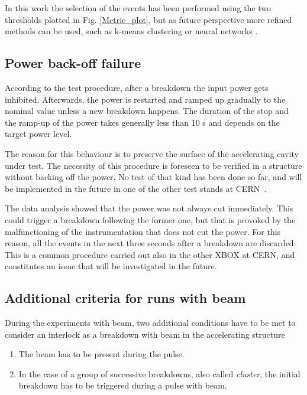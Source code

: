 In this work the selection of the events has been performed using the two thresholds plotted in Fig. \ref{Metric_plot}, but as future perspective more refined methods can be used, such as k-means clustering or neural networks \cite{ML:book}.



\subsection{Power back-off failure}
\label{sec:pbof}

According to the test procedure, after a breakdown the input power gets inhibited. Afterwards, the power is restarted and ramped up gradually to the nominal value unless a new breakdown happens. The duration of the stop and the ramp-up of the power takes generally less than 10 s and depends on the target power level.

The reason for this behaviour is to preserve the surface of the accelerating cavity under test. The necessity of this procedure is foreseen to be verified in a structure without backing off the power. No test of that kind has been done so far, and will be implemented in the future in one of the other test stands at CERN~\cite{Walter:PC}.

The data analysis showed that the power was not always cut immediately. This could trigger a breakdown  following the former one, but that is provoked by the malfunctioning of the instrumentation that does not cut the power. For this reason, all the events in the next three seconds after a breakdown are discarded. This is a common procedure carried out also in the other XBOX at CERN, and constitutes an issue that will be investigated in the future. 


\subsection[Additional criteria for runs with beam]{Additional criteria for runs with beam}

During the experiments with beam, two additional conditions have to be met to consider an interlock as a breakdown with beam in the accelerating structure
\begin{enumerate}
\item The beam has to be present during the pulse.
\item In the case of a group of successive breakdowns, also called \textit{cluster}, the initial breakdown has to be triggered during a pulse with beam.
\end{enumerate}





